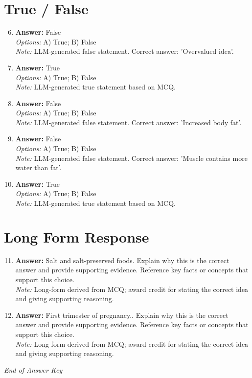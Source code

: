 \documentclass[12pt]{article}
\begin{document}
\section*{True / False}
\begin{enumerate}[label=\arabic*.]
\setcounter{enumi}{5}
\item \textbf{Answer:} False
\\ \textit{Options:} A) True; B) False
\\ \textit{Note:} LLM-generated false statement. Correct answer: 'Overvalued idea'.
\item \textbf{Answer:} True
\\ \textit{Options:} A) True; B) False
\\ \textit{Note:} LLM-generated true statement based on MCQ.
\item \textbf{Answer:} False
\\ \textit{Options:} A) True; B) False
\\ \textit{Note:} LLM-generated false statement. Correct answer: 'Increased body fat'.
\item \textbf{Answer:} False
\\ \textit{Options:} A) True; B) False
\\ \textit{Note:} LLM-generated false statement. Correct answer: 'Muscle contains more water than fat'.
\item \textbf{Answer:} True
\\ \textit{Options:} A) True; B) False
\\ \textit{Note:} LLM-generated true statement based on MCQ.
\end{enumerate}

\section*{Long Form Response}
\begin{enumerate}[label=\arabic*.]
\setcounter{enumi}{10}
\item \textbf{Answer:} Salt and salt-preserved foods. Explain why this is the correct answer and provide supporting evidence. Reference key facts or concepts that support this choice.
\\ \textit{Note:} Long-form derived from MCQ; award credit for stating the correct idea and giving supporting reasoning.
\item \textbf{Answer:} First trimester of pregnancy.. Explain why this is the correct answer and provide supporting evidence. Reference key facts or concepts that support this choice.
\\ \textit{Note:} Long-form derived from MCQ; award credit for stating the correct idea and giving supporting reasoning.
\end{enumerate}

\vfill
\noindent\textit{End of Answer Key}
\end{document}
